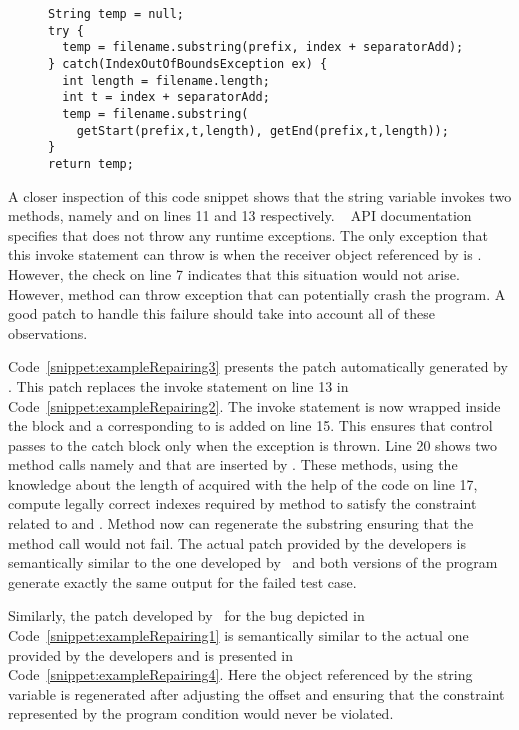 \begin{figure}[t]
\centering
\begin{lstlisting}
String temp = null;
try {
  temp = filename.substring(prefix, index + separatorAdd);
} catch(IndexOutOfBoundsException ex) {
  int length = filename.length;
  int t = index + separatorAdd;
  temp = filename.substring(
    getStart(prefix,t,length), getEnd(prefix,t,length));
}
return temp;
\end{lstlisting}
\end{figure}

A closer inspection of this code snippet shows that the string variable
 invokes two methods, namely  and 
on lines 11 and 13 respectively. \java\  API documentation
specifies that  does not throw any runtime exceptions. The only
exception that this invoke statement can throw is when the receiver object
referenced by  is . However, the check on line 7
indicates that this situation would not arise. However, method 
can throw  exception that can potentially crash
the program. A good patch to handle this failure should take into account all of
these observations. 

Code~\ref{snippet:exampleRepairing3} presents the patch automatically generated
by \tool . This patch replaces the invoke statement on line 13 in
Code~\ref{snippet:exampleRepairing2}. The invoke statement is now wrapped inside
the  block and a  corresponding to
 is added on line 15. This ensures that
control passes to the catch block only when the exception is thrown. Line 20
shows two method calls namely  and  that are
inserted by \tool. These methods, using the knowledge about the length of
 acquired with the help of the code on line 17, compute legally
correct indexes required by  method to satisfy the constraint
related to  and . Method  now
can regenerate the substring ensuring that the method call would not fail.
The actual patch provided by the developers is semantically similar to the one
developed by \tool\ and both versions of the program generate exactly the same
output for the failed test case.

Similarly, the patch developed by \tool\ for the bug depicted in
Code~\ref{snippet:exampleRepairing1} is semantically similar to the actual one
provided by the developers and is presented in
Code~\ref{snippet:exampleRepairing4}. Here the object referenced by the string
variable  is regenerated after adjusting the offset and ensuring that
the constraint represented by the program condition 
would never be violated.


